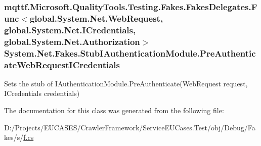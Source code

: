 \hypertarget{class_system_1_1_net_1_1_fakes_1_1_stub_i_authentication_module_a7e92e9ca4d26040699a8ab12c714c7b6}{
\subsubsection[{Pre\-Authenticate\-Web\-Request\-I\-Credentials}]{\setlength{\rightskip}{0pt plus 5cm}mqttf.\-Microsoft.\-Quality\-Tools.\-Testing.\-Fakes.\-Fakes\-Delegates.\-Func$<$global.\-System.\-Net.\-Web\-Request, global.\-System.\-Net.\-I\-Credentials, global.\-System.\-Net.\-Authorization$>$ System.\-Net.\-Fakes.\-Stub\-I\-Authentication\-Module.\-Pre\-Authenticate\-Web\-Request\-I\-Credentials}}\label{class_system_1_1_net_1_1_fakes_1_1_stub_i_authentication_module_a7e92e9ca4d26040699a8ab12c714c7b6}


Sets the stub of I\-Authentication\-Module.\-Pre\-Authenticate(\-Web\-Request request, I\-Credentials credentials)



The documentation for this class was generated from the following file\-:\begin{DoxyCompactItemize}
\item 
D\-:/\-Projects/\-E\-U\-C\-A\-S\-E\-S/\-Crawler\-Framework/\-Service\-E\-U\-Cases.\-Test/obj/\-Debug/\-Fakes/s/\hyperlink{s_2f_8cs}{f.\-cs}\end{DoxyCompactItemize}
